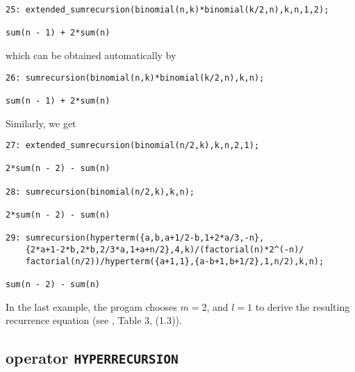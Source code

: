 {\small
\begin{verbatim}
25: extended_sumrecursion(binomial(n,k)*binomial(k/2,n),k,n,1,2);

sum(n - 1) + 2*sum(n)
\end{verbatim}
}\noindent
which can be obtained automatically by
{\small
\begin{verbatim}
26: sumrecursion(binomial(n,k)*binomial(k/2,n),k,n);

sum(n - 1) + 2*sum(n)
\end{verbatim}
}\noindent
Similarly, we get
{\small
\begin{verbatim}
27: extended_sumrecursion(binomial(n/2,k),k,n,2,1);

2*sum(n - 2) - sum(n)

28: sumrecursion(binomial(n/2,k),k,n);

2*sum(n - 2) - sum(n)

29: sumrecursion(hyperterm({a,b,a+1/2-b,1+2*a/3,-n},
    {2*a+1-2*b,2*b,2/3*a,1+a+n/2},4,k)/(factorial(n)*2^(-n)/
    factorial(n/2))/hyperterm({a+1,1},{a-b+1,b+1/2},1,n/2),k,n);

sum(n - 2) - sum(n)
\end{verbatim}
}\noindent
In the last example, the progam chooses $m=2$, and $l=1$ to derive the
resulting recurrence equation (see \cite{Koepf:94b}, Table 3, (1.3)).


\subsection{\REDUCE{} operator {\tt HYPERRECURSION}}

